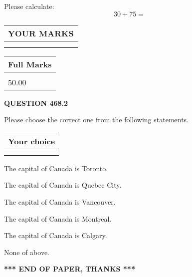 \documentclass[12pt]{article}
\begin{document}
  
 
Please calculate:
\begin{equation}
30 +  %
75 = \nonumber
\end{equation}
 

 

 
  
\vspace{0.2in}
  
\noindent\begin{tabular}{|l|}
\hline
 YOUR MARKS  \\
\hline
 \\ 
 \\ 
\hline
\end{tabular}
\hspace{0.05in} \begin{tabular}{|l|}
\hline
 Full Marks  \\
\hline
 \\ 
50.00 \\
\hline
\end{tabular}
{\textbf{\Large{QUESTION
468.2 
}}}
  
  
Please choose the correct one from the following statements.
  
  
\noindent\hspace{3.0in} \begin{tabular}{|l|}
\hline
Your choice \\
\hline
 \\ 
 \\ 
\hline
\end{tabular}
  
  
 
 
The capital of Canada is Toronto.
 
 
The capital of Canada is Quebec City.
 
 
The capital of Canada is Vancouver.
 
 
The capital of Canada is Montreal.
 
 
The capital of Canada is Calgary.
 
 
 None of above.
 
 
   
   
 \vspace{0.2in}
 
   
   
   
   
\vspace{1.0in} 
{\textbf{\large{ *** END OF PAPER, THANKS *** }}} 
   
\end{document}
